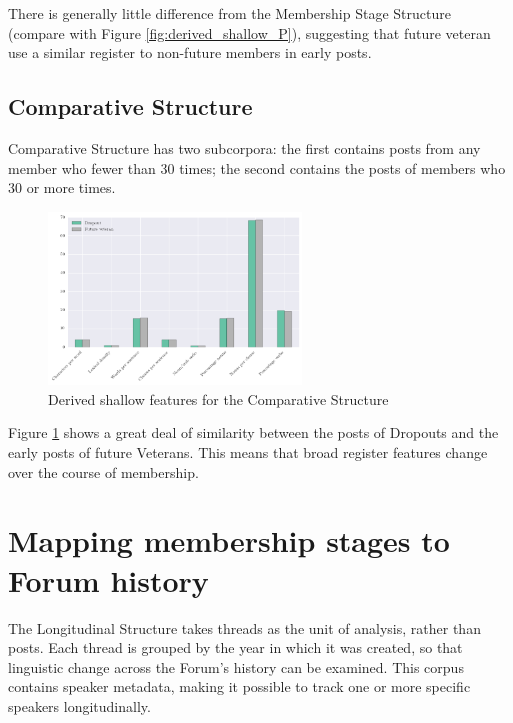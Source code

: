 There is generally little difference from the Membership Stage Structure (compare with Figure \ref{fig:derived_shallow_P}), suggesting that future veteran  use a similar register to non\hyp{}future \glspl{member} in early \glspl{post}.

\subsection{Comparative Structure}

Comparative Structure has two subcorpora: the first contains \glspl{post} from any \gls{member} who  fewer than 30 times; the second contains the \glspl{post} of members who  30 or more times.

\begin{figure}[htb]
\centering
\includegraphics[width=0.6\textwidth]{../images/derived-shallow-features-in-C-corpus.png}
\caption{Derived shallow features for the Comparative Structure}
\label{fig:derived_shallow_C}
\end{figure}

Figure \ref{fig:derived_shallow_C} shows a great deal of similarity between the \glspl{post} of Dropouts and the early \glspl{post} of future Veterans. This means that broad register features change over the course of membership.

\section{Mapping membership stages to Forum history}

The Longitudinal Structure takes \glspl{thread} as the unit of analysis, rather than \glspl{post}. Each \gls{thread} is grouped by the year in which it was created, so that linguistic change across the \gls{Forum}'s history can be examined. This corpus contains speaker metadata, making it possible to track one or more specific speakers longitudinally.

